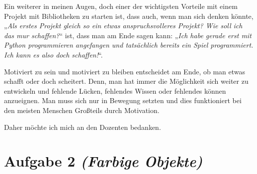 \documentclass[a4paper,12pt]{article}
\begin{document}
Ein weiterer in meinen Augen, doch einer der wichtigsten Vorteile mit einem Projekt mit Bibliotheken zu starten ist, dass auch, wenn man sich denken könnte, „\textit{Als erstes Projekt gleich so ein etwas anspruchsvolleres Projekt? Wie soll ich das mur schaffen?}“ ist, dass man am Ende sagen kann: „\textit{Ich habe gerade erst mit Python programmieren angefangen und tatsächlich bereits ein Spiel programmiert. Ich kann es also doch schaffen!}“. \par \vspace\baselineskip
Motiviert zu sein und motiviert zu bleiben entscheidet am Ende, ob man etwas schafft oder doch scheitert. Denn, man hat immer die Möglichkeit sich weiter zu entwickeln und fehlende Lücken, fehlendes Wissen oder fehlendes können anzueignen. Man muss sich nur in Bewegung setzten und dies funktioniert bei den meisten Menschen Großteils durch Motivation. \par \vspace\baselineskip
Daher möchte ich mich an den Dozenten bedanken.
\clearpage
\section{Aufgabe 2 \textit{(Farbige Objekte)}}
\end{document}
